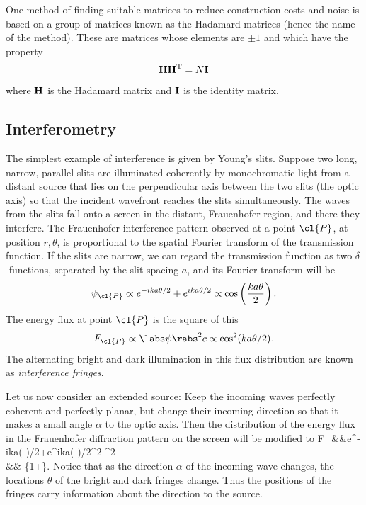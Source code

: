 One method of finding suitable matrices to reduce construction costs and noise is based on a group of matrices known as the Hadamard matrices (hence the name of the method). These are matrices whose elements are $\pm 1$ and which have the property
\[
{\bf H}{\bf H}^{\rm T}=N{\bf I}
\]
where ${\bf H}$ is the Hadamard matrix and ${\bf I}$ is the identity matrix. 

\subsection{Interferometry}

The simplest example of interference is given by Young's slits. Suppose two long,
narrow, parallel slits are illuminated coherently by monochromatic light from a distant
source that lies on the perpendicular axis between the two slits (the optic axis) so that the incident wavefront reaches the slits simultaneously. The waves from the slits fall onto a screen in the distant, Frauenhofer region, and there they interfere. The Frauenhofer 
interference pattern observed at a point $\cl{P}$, at position $r,\theta$, is proportional to the spatial Fourier transform of the transmission function. If the slits are 
narrow, we can regard the transmission function as two $\delta$-functions, separated
by the slit spacing $a$, and its Fourier transform will be
\[
\psi_{\cl{P}}\propto e^{-ika\theta/2}+e^{ika\theta/2}\propto\cos\left({ka\theta\over 2}\right).
\]
The energy flux at point $\cl{P}$ is the square of this
\[
F_{\cl{P}}\propto\labs\psi\rabs^2c\propto\cos^2({ka\theta/2}).
\]
The alternating bright and dark illumination in this flux distribution are known as {\it interference fringes}. 

Let us now consider an extended source: Keep the incoming waves perfectly 
coherent and perfectly planar, but change their incoming direction so that it makes a small angle $\alpha$ to the optic axis. Then the distribution of the energy flux in the
Frauenhofer diffraction pattern on the screen will be modified to 
\bua
F_{}&\propto&\labs e^{-ika(\theta-\alpha)/2}+e^{ika(\theta-\alpha)/2}\rabs^2
      \propto\cos^2 \\
             &\propto& \{1+\}.
\eua
Notice that as the direction $\alpha$ of the incoming wave changes, the locations $\theta$ of the bright and dark fringes change. Thus the positions of the fringes carry information about the direction to the source. 

